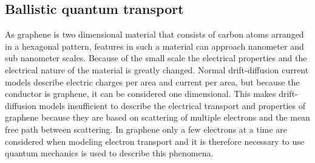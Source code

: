 \subsection{Ballistic quantum transport}
As graphene is two dimensional material that consists of carbon atoms arranged in a hexagonal pattern, features in such a material can approach nanometer and sub nanometer scales. Because of the small scale the electrical properties and the electrical nature of the material is greatly changed. Normal drift-diffusion current models describe electric charges per area and current per area, but because the conductor is graphene, it can be considered one dimensional. This makes drift-diffusion models insufficient to describe the electrical transport and properties of graphene because they are based on scattering of multiple electrons and the mean free path between scattering. In graphene only a few electrons at a time are considered when modeling electron transport and it is therefore necessary to use quantum mechanics is used to describe this phenomena. 
